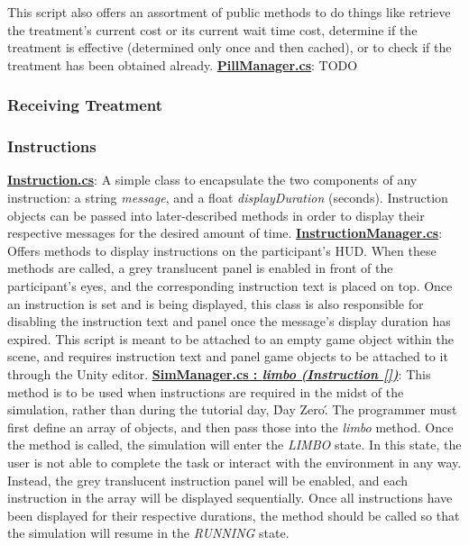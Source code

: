 \documentclass{article}
\begin{document}
This script also offers an assortment of public methods to do things like retrieve the treatment's current cost or its current wait time cost, determine if the treatment is effective (determined only once and then cached), or to check if the treatment has been obtained already. \newline \newline
\href{https://bit.ly/2JDPChz}{\textbf{PillManager.cs}}: TODO 

\subsubsection{Receiving Treatment} %


\subsubsection{Instructions} %
\href{https://bit.ly/2JFHEED}{\textbf{Instruction.cs}}: A simple class to encapsulate the two components of any instruction: a string \textit{message}, and a float \textit{displayDuration} (seconds). Instruction objects can be passed into later-described methods in order to display their respective messages for the desired amount of time. \newline \newline
\href{https://bit.ly/2TzLE9i}{\textbf{InstructionManager.cs}}: Offers methods to display instructions on the participant's HUD. When these methods are called, a grey translucent panel is enabled in front of the participant's eyes, and the corresponding instruction text is placed on top. Once an instruction is set and is being displayed, this class is also responsible for disabling the instruction text and panel once the message's display duration has expired. This script is meant to be attached to an empty game object within the scene, and requires instruction text and panel game objects to be attached to it through the Unity editor. \newline \newline
\href{https://bit.ly/2UhmSzq}{\textbf{SimManager.cs : \textit{limbo (Instruction [])}}}: This method is to be used when instructions are required in the midst of the simulation, rather than during the tutorial day, \'Day Zero\'. The programmer must first define an array of  objects, and then pass those into the \textit{limbo} method. Once the method is called, the simulation will enter the \textit{LIMBO} state. In this state, the user is not able to complete the task or interact with the environment in any way. Instead, the grey translucent instruction panel will be enabled, and each instruction in the array will be displayed sequentially. Once all instructions have been displayed for their respective durations, the  method should be called so that the simulation will resume in the \textit{RUNNING} state. \newline \newline
\end{document}
